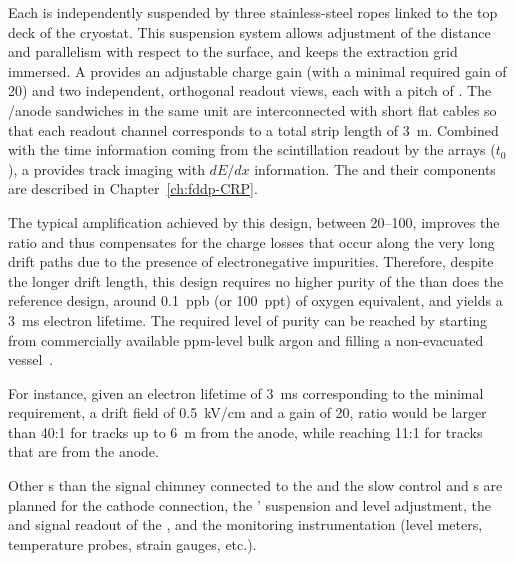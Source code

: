 Each  is independently suspended by three stainless-steel ropes linked to the top deck of the cryostat. This suspension system allows adjustment of the  distance and parallelism with respect to the \lar surface, and keeps the extraction grid immersed. A  provides an adjustable charge gain (with a minimal required gain of \num{20}) and two independent, orthogonal readout views, each with a pitch of \dpstrippitch.  The /anode sandwiches  in the same  unit are interconnected with short flat cables so that each readout channel corresponds to a total strip length of \SI{3}{m}. Combined with the time information coming from the \lar scintillation readout by the  arrays ($t_0$), a  provides \threed track imaging with $dE/dx$ information.  The  and their components are described in Chapter~\ref{ch:fddp-CRP}.

The typical amplification achieved by this design, between \numrange{20}{100}, improves the  ratio and thus  compensates for the charge losses that occur along the very long drift paths due to the presence of  electronegative impurities. Therefore, despite the longer drift length, this design requires no higher 
purity of the \lar than does the reference design, around \SI{0.1}{ppb} (or \SI{100}{ppt}) of oxygen equivalent, and yields a \SI{3}{ms} electron lifetime. The required level of purity can be reached by starting from  commercially available ppm-level bulk argon and filling a non-evacuated vessel~\cite{WA105_TDR}.


For instance, given an electron lifetime of \SI{3}{ms} corresponding to the minimal requirement,  a drift field of \SI{0.5}{kV/cm} and a  gain of \num{20},  ratio would be larger than  \num{40}:\num{1} for tracks up to \SI{6}{m} from the anode, while reaching  \num{11}:\num{1} for   tracks that are \dpmaxdrift from the anode.


Other \fdth{}s than the signal chimney connected to the  and the  slow control and \fdth{}s are planned for the cathode  connection, the ' suspension and level adjustment, the  and signal readout of the , and the monitoring instrumentation (level meters, temperature probes, strain gauges, etc.).

